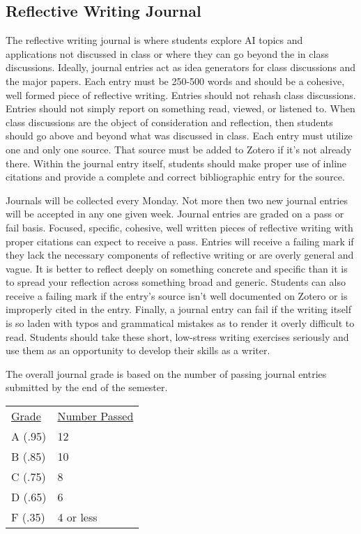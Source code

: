 \documentclass[nobib]{tufte-handout}
\begin{document}
\subsection{Reflective Writing Journal}

The reflective writing journal is where students explore AI topics and applications not discussed in class or where they can go beyond the in class discussions. Ideally, journal entries act as idea generators for class discussions and the major papers. Each entry must be 250-500 words and should be a cohesive, well formed piece of reflective writing. Entries should not rehash class discussions. Entries should not simply report on something read, viewed, or listened to. When class discussions are the object of consideration and reflection, then students should go above and beyond what was discussed in class. Each entry must utilize one and only one source. That source must be added to Zotero if it's not already there. Within the journal entry itself, students should make proper use of inline citations and provide a complete and correct bibliographic entry for the source. 

Journals will be collected every Monday. Not more then two new journal entries will be accepted in any one given week. Journal entries are graded on a pass or fail basis. Focused, specific, cohesive, well written pieces of reflective writing with proper citations can expect to receive a pass. Entries will receive a failing mark if they lack the necessary components of reflective writing or are overly general and vague. It is better to reflect deeply on something concrete and specific than it is to spread your reflection across something broad and generic. Students can also receive a failing mark if the entry's source isn't well documented on Zotero or is improperly cited in the entry. Finally, a journal entry can fail if the writing itself is so laden with typos and grammatical mistakes as to render it overly difficult to read.  Students should take these short, low-stress writing exercises seriously and use them as an opportunity to develop their skills as a writer. 

The overall journal grade is based on the number of passing journal entries submitted by the end of the semester. 

\begin{center}
\begin{tabular}{ll}
\underline{Grade} & \underline{Number Passed} \\
A (.95) & 12 \\
B (.85) & 10 \\
C (.75) & 8 \\
D (.65) & 6\\
F (.35) & 4 or less \\
\end{tabular}
\end{center}
\end{document}
